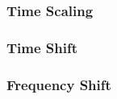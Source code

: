 \subsubsection{Time Scaling}\label{subsubsec:Laplace_Time_Scaling}
\subsubsection{Time Shift}\label{subsubsec:Laplace_Time_Shift}
\subsubsection{Frequency Shift}\label{subsubsec:Laplace_Frequency_Shift}


